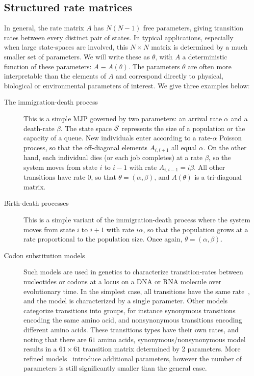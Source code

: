 \subsection{Structured rate matrices}
In general, the rate matrix $A$ has $N(N-1)$ free parameters,
giving transition rates between every distinct pair of states. 
In typical applications, especially when large state-spaces
are involved, this $N \times N$ matrix is determined by a much smaller
set of parameters. We will write these as $\theta$, with
$A$ a deterministic function of these parameters: 
$A \equiv A(\theta)$. The parameters $\theta$ are often more 
interpretable than the elements of $A$ and correspond directly to
physical, biological or environmental parameters of interest. 
We give three examples below:
\begin{description}
  \item[The immigration-death process] This is a simple MJP governed
    by two parameters: an arrival rate $\alpha$ and a death-rate
    $\beta$. The state space ${\mathcal S}$ represents the size of a 
    population or the capacity of a queue. New individuals
    enter according to a rate-$\alpha$ Poisson process,
    so that the off-diagonal elements $A_{i,i+1}$ all equal $\alpha$.
    On the other hand, each individual dies (or each job completes) 
    at a rate $\beta$, so the system moves from state $i$ to 
    $i-1$ with rate $A_{i,i-1}=i\beta$.
    All other transitions have rate $0$, so that $\theta = (\alpha,\beta)$,
    and $A(\theta)$ is a tri-diagonal matrix.
  \item[Birth-death processes] This is a simple variant of the
    immigration-death process where the system moves from state $i$ 
    to $i+1$ with rate $i\alpha$, so that the population grows at a 
    rate proportional to the population size. Once again, 
    $\theta=(\alpha,\beta)$.
  \item[Codon substitution models] Such models are used in genetics
    to characterize transition-rates between nucleotides or codons at a locus on
    a DNA or RNA molecule over evolutionary time. In the simplest case,
    all transitions have the same rate~\cite{jukescantor69}, and the model is 
    characterized by a single parameter. Other models categorize transitions 
    into groups, for instance synonymous transitions encoding 
    the same amino acid, and nonsynonymous transitions encoding different 
    amino acids.  These transitions types have their own rates, and noting that 
    there are $61$ amino acids, synonymous/nonsynonymous model results in a 
    $61\times 61$ transition matrix determined by 2 parameters. More refined 
    models~\cite{goldman1994codon} introduce additional parameters, however the 
    number of parameters is still significantly smaller than the general case.
\end{description}
